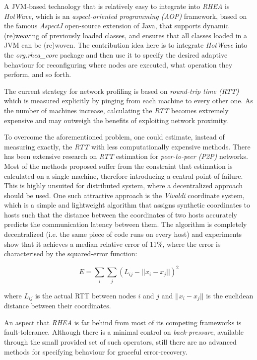 \documentclass{dithesis}
\begin{document}
A JVM-based technology that is relatively easy to integrate into \textit{RHEA} is \textit{HotWave}\cite{reconf_java}, which is an \textit{aspect-oriented programming (AOP)} framework, based on the famous \textit{AspectJ}\cite{aspect} open-source extension of Java, that supports dynamic (re)weaving of previously loaded classes, and ensures that all classes loaded in a JVM can be (re)woven. The contribution idea here is to integrate \textit{HotWave} into the \textit{org.rhea\_core} package and then use it to specify the desired adaptive behaviour for reconfiguring where nodes are executed, what operation they perform, and so forth.


The current strategy for network profiling is based on \textit{round-trip time (RTT)} which is measured explicitly by pinging from each machine to every other one. As the number of machines increase, calculating the \textit{RTT} becomes extremely expensive and may outweigh the benefits of exploiting network proximity. 

To overcome the aforementioned problem, one could estimate, instead of measuring exactly, the \textit{RTT} with less computationally expensive methods. There has been extensive research on \textit{RTT} estimation for \textit{peer-to-peer (P2P)} networks\cite{rtt_survey}. Most of the methods proposed suffer from the constraint that estimation is calculated on a single machine, therefore introducing a central point of failure. This is highly unsuited for distributed system, where a decentralized approach should be used. One such attractive approach is the \textit{Vivaldi} coordinate system\cite{vivaldi}, which is a simple and lightweight algorithm that assigns synthetic coordinates to hosts such that the distance between the coordinates of two hosts accurately predicts the communication latency between them. The algorithm is completely decentralized (i.e. the same piece of code runs on every host) and experiments show that it achieves a median relative error of 11\%, where the error is characterised by the squared-error function:

\[ E =  \sum_i \sum_j (L_{ij}-||x_i - x_j||)^2  \]

where $L_{ij}$ is the actual RTT between nodes $i$ and $j$ and $||x_i - x_j||$ is the euclidean distance between their coordinates.


An aspect that \textit{RHEA} is far behind from most of its competing frameworks is fault-tolerance. Although there is a minimal control on \textit{back-pressure}, available through the small provided set of such operators, still there are no advanced methods for specifying behaviour for graceful error-recovery.
\end{document}

